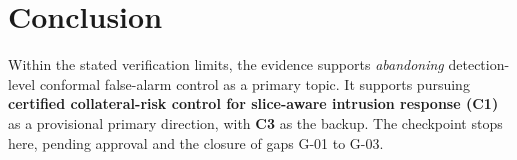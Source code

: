 \hypertarget{sec:conc}{%
\section{Conclusion}\label{sec:conc}}

Within the stated verification limits, the evidence supports
\emph{abandoning} detection-level conformal false-alarm control as a
primary topic. It supports pursuing \textbf{certified collateral-risk
control for slice-aware intrusion response (C1)} as a provisional
primary direction, with \textbf{C3} as the backup. The checkpoint stops
here, pending approval and the closure of gaps G-01 to G-03.
